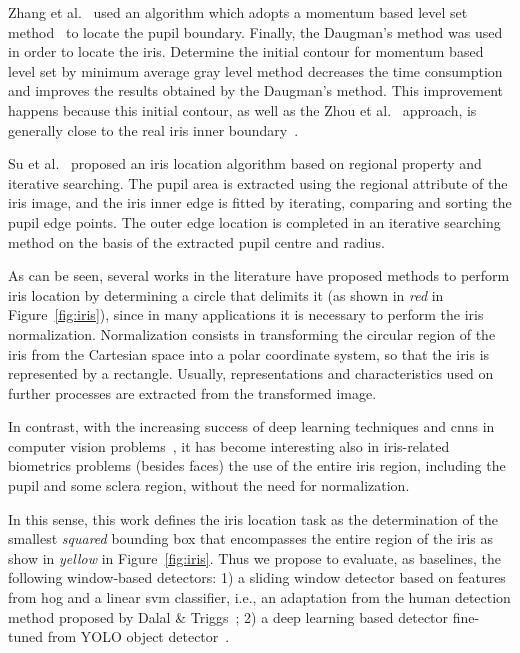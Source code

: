 \documentclass[conference]{IEEEtran}
\begin{document}
Zhang et al.~\cite{zhang2014new} used an algorithm which adopts a momentum based level set method~\cite{lathen2009momentum, wang2010momentum} to locate the pupil boundary. 
Finally, the Daugman's method was used in order to locate the iris.
Determine the initial contour for momentum based level set by minimum average gray level method decreases the time consumption and improves the results obtained by the Daugman's method. This improvement happens because this initial contour, as well as the Zhou et al.~\cite{zhou2013new} approach, is generally close to the real iris inner boundary~\cite{zhang2014new}.

Su et al.~\cite{su2017iris} proposed an iris location algorithm based on regional property and iterative searching. 
The pupil area is extracted using the regional attribute of the iris image, and the iris inner edge is fitted by iterating, comparing and sorting the pupil edge points. The outer edge location is completed in an iterative searching method on the basis of the extracted pupil centre and radius.


As can be seen, several works in the literature have proposed methods to perform iris location by determining a circle that delimits it (as shown in \textit{red} in Figure~\ref{fig:iris}), since in many applications it is necessary to perform the iris normalization.
Normalization consists in transforming the circular region of the iris from the Cartesian space into a polar coordinate system, so that the iris is represented by a rectangle.
Usually, representations and characteristics used on further processes are extracted from the transformed image.

In contrast, with the increasing success of deep learning techniques and \glspl*{cnn} in computer vision problems~\cite{Hinton:2006,Pinto:2011a,Krizhevsky12, menotti2015deep, mao2017eeg, fan2017multi}, it has become interesting also in iris-related biometrics problems (besides faces) the use of the entire iris region, including the pupil and some sclera region, without the need for normalization.

In this sense, this work defines the iris location task as the determination of the smallest \textit{squared} bounding box that encompasses the entire region of the iris as show in \textit{yellow} in Figure~\ref{fig:iris}.
Thus we propose to evaluate, as baselines, the following window-based detectors:
1) a sliding window detector based on features from \gls*{hog} and a linear \gls*{svm} classifier, i.e., an adaptation from the human detection method proposed by Dalal \& Triggs~\cite{dalal2005histograms};
2) a deep learning based detector fine-tuned from YOLO object detector~\cite{redmon:2016,redmon:2017}.
\end{document}
